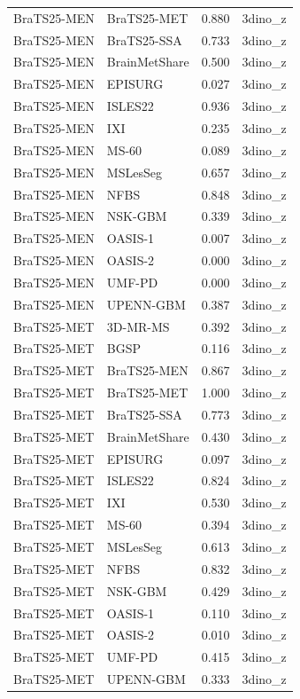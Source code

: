 \begin{tabular}{llrl}
BraTS25-MEN & BraTS25-MET & 0.880 & 3dino\_z \\
BraTS25-MEN & BraTS25-SSA & 0.733 & 3dino\_z \\
BraTS25-MEN & BrainMetShare & 0.500 & 3dino\_z \\
BraTS25-MEN & EPISURG & 0.027 & 3dino\_z \\
BraTS25-MEN & ISLES22 & 0.936 & 3dino\_z \\
BraTS25-MEN & IXI & 0.235 & 3dino\_z \\
BraTS25-MEN & MS-60 & 0.089 & 3dino\_z \\
BraTS25-MEN & MSLesSeg & 0.657 & 3dino\_z \\
BraTS25-MEN & NFBS & 0.848 & 3dino\_z \\
BraTS25-MEN & NSK-GBM & 0.339 & 3dino\_z \\
BraTS25-MEN & OASIS-1 & 0.007 & 3dino\_z \\
BraTS25-MEN & OASIS-2 & 0.000 & 3dino\_z \\
BraTS25-MEN & UMF-PD & 0.000 & 3dino\_z \\
BraTS25-MEN & UPENN-GBM & 0.387 & 3dino\_z \\
BraTS25-MET & 3D-MR-MS & 0.392 & 3dino\_z \\
BraTS25-MET & BGSP & 0.116 & 3dino\_z \\
BraTS25-MET & BraTS25-MEN & 0.867 & 3dino\_z \\
BraTS25-MET & BraTS25-MET & 1.000 & 3dino\_z \\
BraTS25-MET & BraTS25-SSA & 0.773 & 3dino\_z \\
BraTS25-MET & BrainMetShare & 0.430 & 3dino\_z \\
BraTS25-MET & EPISURG & 0.097 & 3dino\_z \\
BraTS25-MET & ISLES22 & 0.824 & 3dino\_z \\
BraTS25-MET & IXI & 0.530 & 3dino\_z \\
BraTS25-MET & MS-60 & 0.394 & 3dino\_z \\
BraTS25-MET & MSLesSeg & 0.613 & 3dino\_z \\
BraTS25-MET & NFBS & 0.832 & 3dino\_z \\
BraTS25-MET & NSK-GBM & 0.429 & 3dino\_z \\
BraTS25-MET & OASIS-1 & 0.110 & 3dino\_z \\
BraTS25-MET & OASIS-2 & 0.010 & 3dino\_z \\
BraTS25-MET & UMF-PD & 0.415 & 3dino\_z \\
BraTS25-MET & UPENN-GBM & 0.333 & 3dino\_z \\

\end{tabular}
